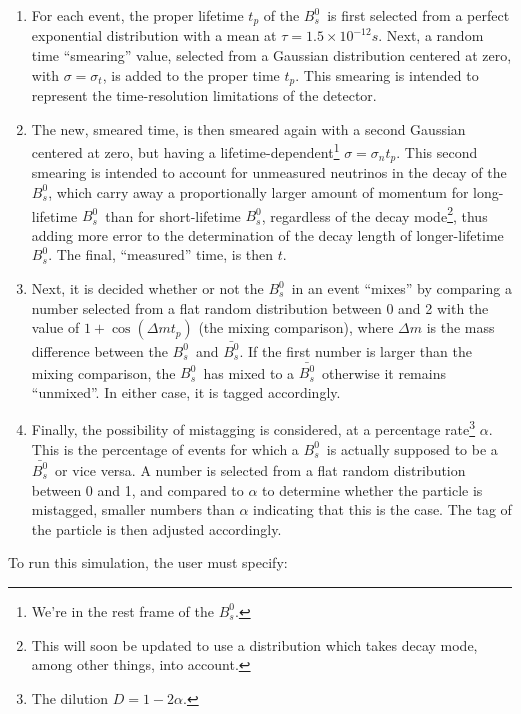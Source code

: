 \documentclass{article}
\newcommand{\Bs}{\mbox{$B_{s}^{0}$}}
\newcommand{\Bsbar}{\mbox{$\bar{B_{s}^{0}}$}}
\begin{document}
\begin{enumerate}
\item For each event, the proper lifetime $t_p$ of the \Bs\ is first selected from a perfect exponential distribution with a mean at $\tau = 1.5 \times 10^{-12}s$. Next, a random time ``smearing'' value, selected from a Gaussian distribution centered at zero, with $\sigma = \sigma_t$, is added to the proper time $t_p$.
This smearing is intended to represent the time-resolution limitations of the detector.  

\item The new, smeared time, is then smeared again with a second Gaussian centered at zero, but having a lifetime-dependent\footnote{We're in the rest frame of the \Bs.} $\sigma = \sigma_nt_p$.  This second smearing is intended to account for unmeasured neutrinos in the decay of the \Bs, which carry away a proportionally larger amount of momentum for long-lifetime \Bs\ than for short-lifetime \Bs, regardless of the decay mode\footnote{This will soon be updated to use a distribution which takes decay mode, among other things, into account.}, thus adding more error to the determination of the decay length of longer-lifetime \Bs.  The final, ``measured'' time, is then $t$.

\item Next, it is decided whether or not the \Bs\ in an event ``mixes'' by comparing a number selected from a flat random distribution between 0 and 2 with the value of $1+\cos(\Delta m t_p)$ (the mixing comparison), where $\Delta m$ is the mass difference between the \Bs\ and \Bsbar.  If the first number is larger than the mixing comparison, the \Bs\ has mixed to a \Bsbar\, otherwise it remains ``unmixed''.  In either case, it is tagged accordingly.

\item Finally, the possibility of mistagging is considered, at a percentage rate\footnote{\label{dilution}The dilution $D = 1-2\alpha$.} $\alpha$.  This is the percentage of events for which a \Bs\ is actually supposed to be a \Bsbar\, or vice versa.  A number is selected from a flat random distribution between 0 and 1, and compared to $\alpha$ to determine whether the particle is mistagged, smaller numbers than $\alpha$ indicating that this is the case.  The tag of the particle is then adjusted accordingly.
\end{enumerate}
To run this simulation, the user must specify:
\end{document}
